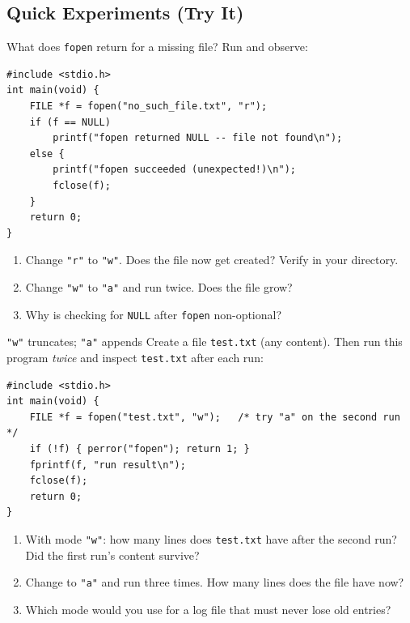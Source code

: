 \documentclass[11pt]{article}
\begin{document}
\subsection*{Quick Experiments (Try It)}

\begin{tryit}{What does \texttt{fopen} return for a missing file?}
Run and observe:
\begin{lstlisting}
#include <stdio.h>
int main(void) {
    FILE *f = fopen("no_such_file.txt", "r");
    if (f == NULL)
        printf("fopen returned NULL -- file not found\n");
    else {
        printf("fopen succeeded (unexpected!)\n");
        fclose(f);
    }
    return 0;
}
\end{lstlisting}
\begin{enumerate}[nosep,leftmargin=*]
  \item Change \texttt{"r"} to \texttt{"w"}. Does the file now get created? Verify in
        your directory.
  \item Change \texttt{"w"} to \texttt{"a"} and run twice. Does the file grow?
  \item Why is checking for \texttt{NULL} after \texttt{fopen} non-optional?
\end{enumerate}
\end{tryit}

\begin{tryit}{\texttt{"w"} truncates; \texttt{"a"} appends}
Create a file \texttt{test.txt} (any content). Then run this program \emph{twice} and
inspect \texttt{test.txt} after each run:
\begin{lstlisting}
#include <stdio.h>
int main(void) {
    FILE *f = fopen("test.txt", "w");   /* try "a" on the second run */
    if (!f) { perror("fopen"); return 1; }
    fprintf(f, "run result\n");
    fclose(f);
    return 0;
}
\end{lstlisting}
\begin{enumerate}[nosep,leftmargin=*]
  \item With mode \texttt{"w"}: how many lines does \texttt{test.txt} have after the
        second run? Did the first run's content survive?
  \item Change to \texttt{"a"} and run three times. How many lines does the file have now?
  \item Which mode would you use for a log file that must never lose old entries?
\end{enumerate}
\end{tryit}
\end{document}

